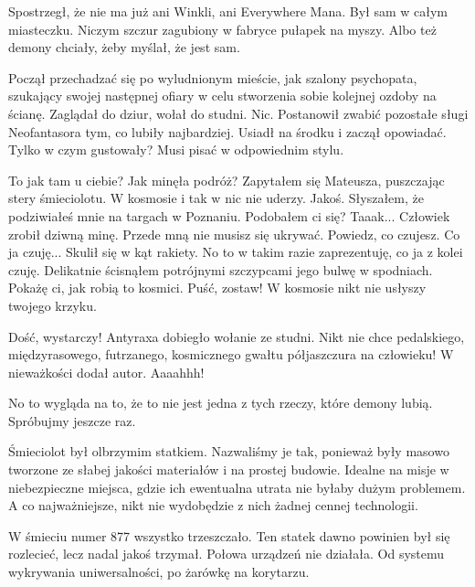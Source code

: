 \divider{}

Spostrzegł, że nie ma już ani Winkli, ani Everywhere Mana. 
Był sam w całym miasteczku. Niczym szczur zagubiony w fabryce pułapek na myszy.
Albo też demony chciały, żeby myślał, że jest sam.

Począł przechadzać się po wyludnionym mieście, jak szalony psychopata, szukający swojej następnej ofiary w celu stworzenia sobie kolejnej ozdoby na ścianę. 
Zaglądał do dziur, wołał do studni. Nic.
Postanowił zwabić pozostałe sługi Neofantasora tym, co lubiły najbardziej.
Usiadł na środku i zaczął opowiadać. Tylko w czym gustowały?
Musi pisać w odpowiednim stylu.

\divider{}

\begin{dialogue}
\ds{} To jak tam u ciebie? Jak minęła podróż? \dm{} Zapytałem się Mateusza, puszczając stery śmieciolotu. W kosmosie i tak w nic nie uderzy.
\ds{} Jakoś.
\ds{} Słyszałem, że podziwiałeś mnie na targach w Poznaniu. Podobałem ci się?
\ds{} Taaak... \dm{} Człowiek zrobił dziwną minę.
\ds{} Przede mną nie musisz się ukrywać. Powiedz, co czujesz.
\ds{} Co ja czuję... \dm{} Skulił się w kąt rakiety.
\ds{} No to w takim razie zaprezentuję, co ja z kolei czuję. \dm{} Delikatnie ścisnąłem potrójnymi szczypcami jego bulwę w spodniach. \dm{} Pokażę ci, jak robią to kosmici.
\ds{} Puść, zostaw!
\ds{} W kosmosie nikt nie usłyszy twojego krzyku.
\end{dialogue}

\divider{}

\begin{dialogue}
\ds{} Dość, wystarczy! \dm{} Antyraxa dobiegło wołanie ze studni. \dm{} Nikt nie chce pedalskiego, międzyrasowego, futrzanego, kosmicznego gwałtu półjaszczura na człowieku!
\ds{} W nieważkości \dm{} dodał autor.
\ds{} Aaaahhh!
\end{dialogue}
No to wygląda na to, że to nie jest jedna z tych rzeczy, które demony lubią.
Spróbujmy jeszcze raz.

\divider{}

Śmieciolot był olbrzymim statkiem. 
Nazwaliśmy je tak, ponieważ były masowo tworzone ze słabej jakości materiałów i na prostej budowie.
Idealne na misje w niebezpieczne miejsca, gdzie ich ewentualna utrata nie byłaby dużym problemem. 
A co najważniejsze, nikt nie wydobędzie z nich żadnej cennej technologii.

W śmieciu numer 877 wszystko trzeszczało. 
Ten statek dawno powinien był się rozlecieć, lecz nadal jakoś trzymał.
Połowa urządzeń nie działała. Od systemu wykrywania uniwersalności, po żarówkę na korytarzu.

